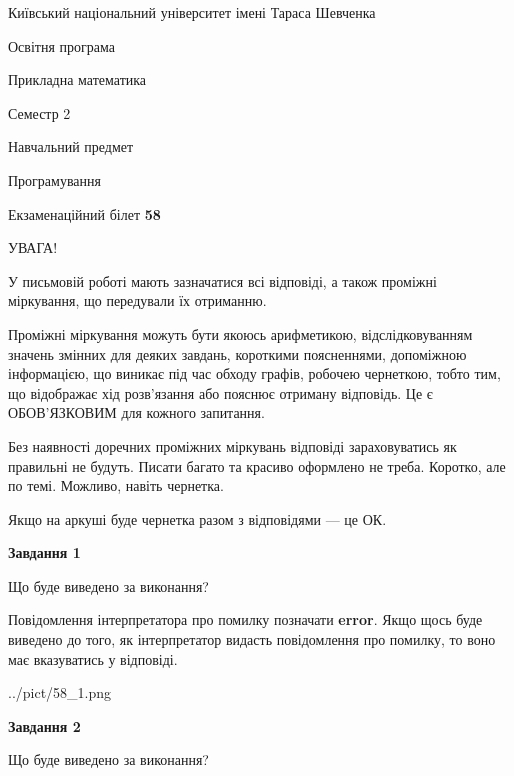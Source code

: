 \documentclass[12pt, ukrainian]{article}
\begin{document}
{{\begin {small}\par
{ \center  Київський національний університет імені Тараса Шевченка \par}
{\parbox {5 cm}{Освітня програма \hfill}{\parbox {7 cm}{Прикладна математика \hfill}}\parbox {6 cm}{\hfill Семестр 2}}\par
{\parbox {5 cm} {Навчальний предмет \hfill}\parbox {7 cm}{Програмування \hfill}\parbox {6cm}{\hfill}\par}\vspace{-7pt} \end{small}}{\center Екзаменаційний білет \No \textbf
{ 58 }\par}}
{
\begin {large}
УВАГА!

У письмовій роботі мають зазначатися всі відповіді, а також проміжні міркування, що передували їх отриманню.

Проміжні міркування можуть бути якоюсь арифметикою, відслідковуванням зна\-чень змінних для деяких завдань,
короткими поясненнями, допоміжною інформацією, що виникає під час обходу графів, робочею чернеткою,
тобто тим, що відображає хід розв’язання або пояснює отриману відповідь.
Це є ОБОВ’ЯЗКОВИМ для кожного запитання.

Без наявності доречних проміжних міркувань відповіді зараховуватись як правиль\-ні не будуть.
Писати багато та красиво оформлено не треба. Коротко, але по темі. Можли\-во, навіть чернетка.

Якщо на аркуші буде чернетка разом з відповідями --- це ОК.

\newpage

{\begin {center}\textbf{Завдання 1}\end {center}}\par
Що буде виведено за виконання?

Повідомлення інтерпретатора про помилку позначати \textbf{error}.
Якщо щось буде виведено до того, як інтерпретатор видасть повідомлення про помилку, 
то воно має вказуватись у відповіді. \par


\begin{center}
	{../pict/58_1.png}
\end{center}
\newpage

{\begin {center}\textbf{Завдання 2}\end {center}}\par
Що буде виведено за виконання?


\end{large}}
\end{document}
